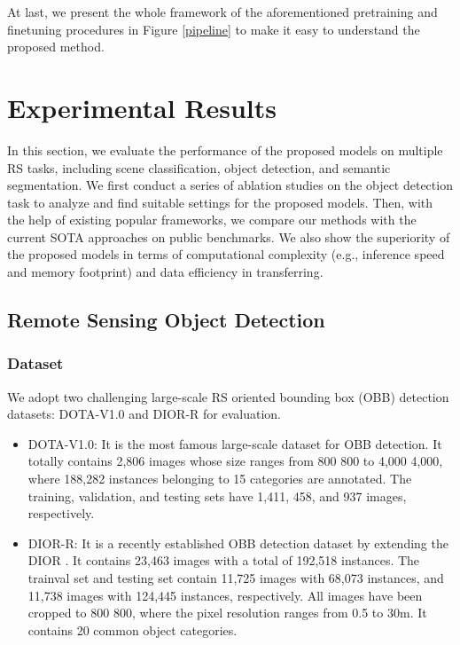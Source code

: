 \documentclass[10pt, journal,twoside]{IEEEtran}
\begin{document}
At last, we present the whole framework of the aforementioned pretraining and finetuning procedures in Figure \ref{pipeline} to make it easy to understand the proposed method.



\section{Experimental Results}
In this section, we evaluate the performance of the proposed models on multiple RS tasks, including scene classification, object detection, and semantic segmentation. We first conduct a series of ablation studies on the object detection task to analyze and find suitable settings for the proposed models. Then, with the help of existing popular frameworks, we compare our methods with the current SOTA approaches on public benchmarks. We also show the superiority of the proposed models in terms of computational complexity (e.g., inference speed and memory footprint) and data efficiency in transferring. 

\subsection{Remote Sensing Object Detection}
\subsubsection{Dataset}
We adopt two challenging large-scale RS oriented bounding box (OBB) detection datasets: DOTA-V1.0 \cite{dota1} and DIOR-R \cite{aod_2022_tgrs_dior_r_aopg} for evaluation.

\begin{itemize}
  \item DOTA-V1.0: It is the most famous large-scale dataset for OBB detection. It totally contains 2,806 images whose size ranges from 800  800 to 4,000  4,000, where 188,282 instances belonging to 15 categories are annotated. The training, validation, and testing sets have 1,411, 458, and 937 images, respectively.
  \item DIOR-R: It is a recently established OBB detection dataset by extending the DIOR \cite{dior}. It contains 23,463 images with a total of 192,518 instances. The trainval set and testing set contain 11,725 images with 68,073 instances, and 11,738 images with 124,445 instances, respectively. All images have been cropped to 800  800, where the pixel resolution ranges from 0.5 to 30m. It contains 20 common object categories.
\end{itemize}
\end{document}
